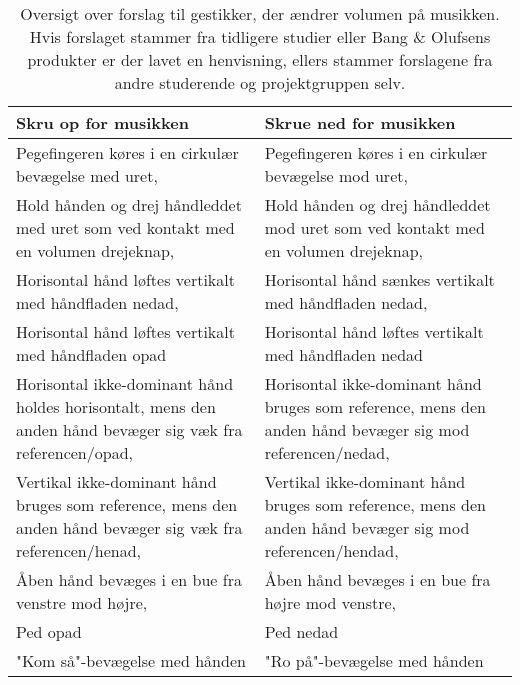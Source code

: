 \begin{table}[H]
	\centering
	\begin{tabular}{| p{6cm} | p{6cm} |}
		\hline
		\textbf{Skru op for musikken} & \textbf{Skrue ned for musikken} \\ \hline
		Pegefingeren køres i en cirkulær bevægelse med uret, \parencite{WEB:BeosoundMoment} & Pegefingeren køres i en cirkulær bevægelse mod uret, \parencite{WEB:BeosoundMoment} \\ \hline
		Hold hånden og drej håndleddet med uret som ved kontakt med en volumen drejeknap, \parencite{WEB:Beosound2} & Hold hånden og drej håndleddet mod uret som ved kontakt med en volumen drejeknap, \parencite{WEB:Beosound2} \\ \hline
		Horisontal hånd løftes vertikalt med håndfladen nedad, \parencite[s. 166]{PDF:ComparingInputModalities} & Horisontal hånd sænkes vertikalt med håndfladen nedad, \parencite[s. 166]{PDF:ComparingInputModalities} \\ \hline
		Horisontal hånd løftes vertikalt med håndfladen opad & Horisontal hånd løftes vertikalt med håndfladen nedad \\ \hline
		Horisontal ikke-dominant hånd holdes horisontalt, mens den anden hånd bevæger sig væk fra referencen/opad, \parencite[s. 48]{PDF:UserDefinedGesturesTV} & Horisontal ikke-dominant hånd bruges som reference, mens den anden hånd bevæger sig mod referencen/nedad, \parencite[s. 48]{PDF:UserDefinedGesturesTV} \\ \hline
		Vertikal ikke-dominant hånd bruges som reference, mens den anden hånd bevæger sig væk fra referencen/henad, \parencite[s. 48]{PDF:UserDefinedGesturesTV} & Vertikal ikke-dominant hånd bruges som reference, mens den anden hånd bevæger sig mod referencen/hendad, \parencite[s. 48]{PDF:UserDefinedGesturesTV} \\ \hline
		Åben hånd bevæges i en bue fra venstre mod højre, \parencite{WEB:BeoplayA9} & Åben hånd bevæges i en bue fra højre mod venstre, \parencite{WEB:BeoplayA9} \\ \hline
		Ped opad & Ped nedad \\ \hline
		"Kom så"-bevægelse med hånden & "Ro på"-bevægelse med hånden \\ \hline		
		
	\end{tabular}
	\caption{Oversigt over forslag til gestikker, der ændrer volumen på musikken. Hvis forslaget stammer fra tidligere studier eller Bang $\&$ Olufsens produkter er der lavet en henvisning, ellers stammer forslagene fra andre studerende og projektgruppen selv.}
	\label{tab:IndsamledeGestikkerVolumen}
\end{table}
\noindent
